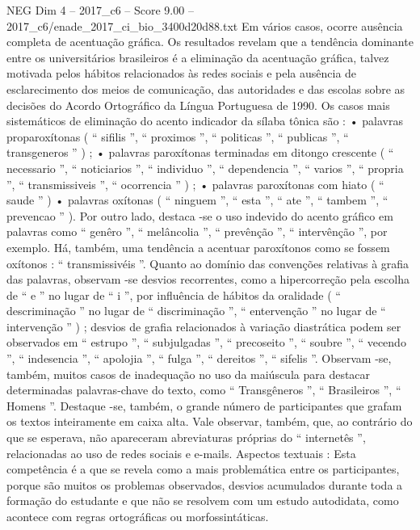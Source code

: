 \begin{textsample}{NEG Dim 4 – 2017\_c6 – Score 9.00 – 2017\_c6/enade\_2017\_ci\_bio\_3400d20d88.txt}
Em vários casos, ocorre ausência completa de acentuação gráfica.
Os resultados revelam que a tendência dominante entre os universitários brasileiros é a eliminação da acentuação gráfica, talvez motivada pelos hábitos relacionados às redes sociais e pela ausência de esclarecimento dos meios de comunicação, das autoridades e das escolas sobre as decisões do Acordo Ortográfico da Língua Portuguesa de 1990.
Os casos mais sistemáticos de eliminação do acento indicador da sílaba tônica são : • palavras proparoxítonas ( “ sifilis ”, “ proximos ”, “ politicas ”, “ publicas ”, “ transgeneros ” ) ; • palavras paroxítonas terminadas em ditongo crescente ( “ necessario ”, “ noticiarios ”, “ individuo ”, “ dependencia ”, “ varios ”, “ propria ”, “ transmissiveis ”, “ ocorrencia ” ) ; • palavras paroxítonas com hiato ( “ saude ” ) • palavras oxítonas ( “ ninguem ”, “ esta ”, “ ate ”, “ tambem ”, “ prevencao ” ).
Por outro lado, destaca -se o uso indevido do acento gráfico em palavras como “ genêro ”, “ melâncolia ”, “ prevênção ”, “ intervênção ”, por exemplo.
Há, também, uma tendência a acentuar paroxítonos como se fossem oxítonos : “ transmissivéis ”.
Quanto ao domínio das convenções relativas à grafia das palavras, observam -se desvios recorrentes, como a hipercorreção pela escolha de “ e ” no lugar de “ i ”, por influência de hábitos da oralidade ( “ descriminação ” no lugar de “ discriminação ”, “ entervenção ” no lugar de “ intervenção ” ) ; desvios de grafia relacionados à variação diastrática podem ser observados em “ estrupo ”, “ subjulgadas ”, “ precoseito ”, “ soubre ”, “ vecendo ”, “ indesencia ”, “ apolojia ”, “ fulga ”, “ dereitos ”, “ sifelis ”.
Observam -se, também, muitos casos de inadequação no uso da maiúscula para destacar determinadas palavras-chave do texto, como “ Transgêneros ”, “ Brasileiros ”, “ Homens ”.
Destaque -se, também, o grande número de participantes que grafam os textos inteiramente em caixa alta.
Vale observar, também, que, ao contrário do que se esperava, não apareceram abreviaturas próprias do “ internetês ”, relacionadas ao uso de redes sociais e e-mails.
Aspectos textuais : Esta competência é a que se revela como a mais problemática entre os participantes, porque são muitos os problemas observados, desvios acumulados durante toda a formação do estudante e que não se resolvem com um estudo autodidata, como acontece com regras ortográficas ou morfossintáticas.

\end{textsample}
